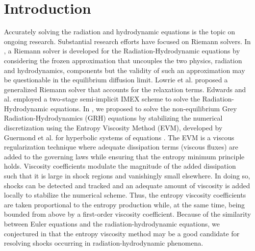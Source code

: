 \documentclass{mc2015}
\begin{document}
\section{Introduction}\label{sec:intro}
%
Accurately solving the radiation and hydrodynamic equations is the topic on ongoing research. 
Substantial research efforts have focused on Riemann solvers. In
\cite{Balsara},  a Riemann solver is developed for the Radiation-Hydrodynamic equations by considering the frozen approximation 
that uncouples the two physics, radiation and hydrodynamics, components but the validity of such an approximation may be questionable 
in the equilibrium diffusion limit. 
Lowrie et al. \cite{LowrieMorelHittinger} proposed a generalized Riemann solver that accounts for the relaxation terms. 
Edwards and al. \cite{EdwardsMorelLowrie} employed a two-stage semi-implicit IMEX scheme to solve the Radiation-Hydrodynamic equations. 
%
%
In \cite{our_jcp_radhy_paper}, we proposed to solve the non-equilibrium Grey Radiation-Hydrodynamics (GRH) equations by stabilizing the numerical discretization 
using the Entropy Viscosity Method (EVM), developed by Guermond et al. for hyperbolic systems of equations \cite{jlg1, jlg2}. 
%
The EVM is a viscous regularization technique where adequate dissipation terms (viscous fluxes) are added to the governing laws while ensuring 
that the entropy minimum principle holds. Viscosity coefficients modulate the magnitude of the added dissipation such that it is large in shock regions and vanishingly 
small elsewhere. In doing so, shocks can be detected and tracked and an adequate amount of viscosity is added locally to stabilize the numerical scheme. 
Thus, the entropy viscosity coefficients are taken proportional to the entropy production while, at the same time, being bounded from above by a first-order 
viscosity coefficient.
Because of the similarity between Euler equations and the radiation-hydrodynamic equations, we conjectured in \cite{our_jcp_radhy_paper} that the entropy 
viscosity method may be a good candidate for resolving shocks occurring in radiation-hydrodynamic phenomena.
\end{document}

